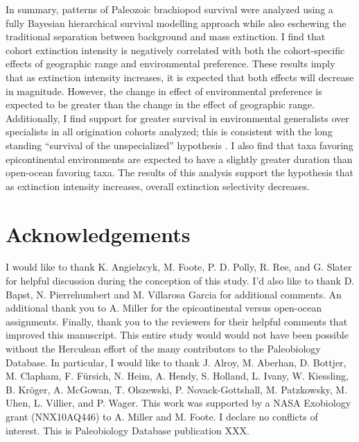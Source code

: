 \documentclass{article}
\begin{document}
In summary, patterns of Paleozoic brachiopod survival were analyzed using a fully Bayesian hierarchical survival modelling approach while also eschewing the traditional separation between background and mass extinction. I find that cohort extinction intensity is negatively correlated with both the cohort-specific effects of geographic range and environmental preference. These results imply that as extinction intensity increases, it is expected that both effects will decrease in magnitude. However, the change in effect of environmental preference is expected to be greater than the change in the effect of geographic range. Additionally, I find support for greater survival in environmental generalists over specialists in all origination cohorts analyzed; this is consistent with the long standing ``survival of the unspecialized'' hypothesis \citep{Liow2004a,Liow2007b,Simpson1944,Simpson1953,Smits2015,Nurnberg2015,Nurnberg2013a, Baumiller1993}. I also find that taxa favoring epicontinental environments are expected to have a slightly greater duration than open-ocean favoring taxa. The results of this analysis support the hypothesis that as extinction intensity increases, overall extinction selectivity decreases.


\section*{Acknowledgements}
I would like to thank K. Angielzcyk, M. Foote, P. D. Polly, R. Ree, and G. Slater for helpful discussion during the conception of this study. I'd also like to thank D. Bapst, N. Pierrehumbert and M. Villarosa Garcia for additional comments. An additional thank you to  A. Miller for the epicontinental versus open-ocean assignments. Finally, thank you to the reviewers for their helpful comments that improved this manuscript. This entire study would would not have been possible without the Herculean effort of the many contributors to the Paleobiology Database. In particular, I would like to thank J. Alroy, M. Aberhan, D. Bottjer, M. Clapham, F. F\"{u}rsich, N. Heim, A. Hendy, S. Holland, L. Ivany, W. Kiessling, B. Kr\"{o}ger, A. McGowan, T. Olszewski, P. Novack-Gottshall, M. Patzkowsky, M. Uhen, L. Villier, and P. Wager. This work was supported by a NASA Exobiology grant (NNX10AQ446) to A. Miller and M. Foote. I declare no conflicts of interest. This is Paleobiology Database publication XXX.


\clearpage




\end{document}
